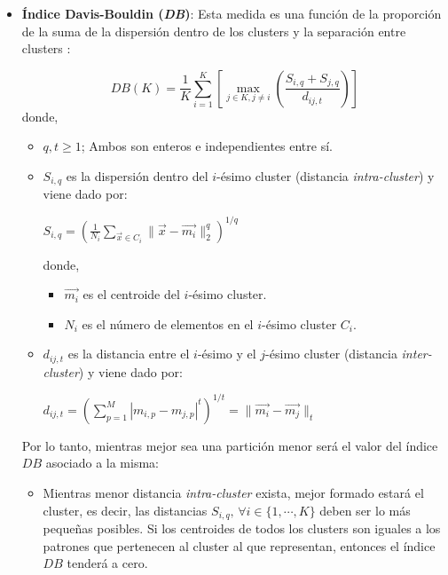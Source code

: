 \begin{itemize}

\item \textbf{Índice Davis-Bouldin (\emph{DB})}:
    Esta medida es una función de la proporción de la suma de la dispersión dentro 
de los clusters y la separación entre clusters \cite{DC_5}:

\begin{equation} \label{mdist: db}
DB(K) = \frac{1}{K} \displaystyle\sum_{i = 1}^K \left[\displaystyle\max_{j \in K, j \neq i}\left( \frac{S_{i,q} + S_{j,q}}{d_{ij,t}}\right)\right]
\end{equation}
donde,
\begin{itemize}
    \item $q,t \geq 1$; Ambos son enteros e independientes entre sí.

    \item $S_{i, q}$ es la dispersión dentro del $i$-ésimo cluster (distancia
          \emph{intra-cluster}) y viene dado por:

            \begin{center}
            $S_{i,q} = \left( \frac{1}{N_i} \displaystyle\sum_{\overrightarrow{x} \in C_i} \|\overrightarrow{x} - \overrightarrow{m_i}\|_{2}^q\right)^{1/q}$
            \end{center}
            donde,
                \begin{itemize}
                    \item $\overrightarrow{m_i}$ es el centroide del $i$-ésimo cluster.
                    \item $N_i$ es el número de elementos en el $i$-ésimo cluster $C_i$.
                \end{itemize}

    \item $d_{ij, t}$ es la distancia entre el $i$-ésimo y el $j$-ésimo cluster
          (distancia \emph{inter-cluster}) y viene dado por:

            \begin{center}
            $ d_{ij,t} = \left(\displaystyle\sum_{p=1}^{M} | m_{i,p} - m_{j,p} |^t \right)^{1/t} = \|\overrightarrow{m_i} - \overrightarrow{m_j}\|_t$
            \end{center}
\end{itemize}

    Por lo tanto, mientras mejor sea una partición menor será el valor del índice
$DB$ asociado a la misma:
\begin{itemize}
    \item Mientras menor distancia \emph{intra-cluster} exista, mejor formado
estará el cluster, es decir, las distancias $S_{i,q}\text{, }\forall i \in \{1, \cdots, K\}$
deben ser lo más pequeñas posibles. Si los centroides de todos los clusters son
iguales a los patrones que pertenecen al cluster al que representan, entonces el
índice $DB$ tenderá a cero.


\end{itemize}
\end{itemize}
